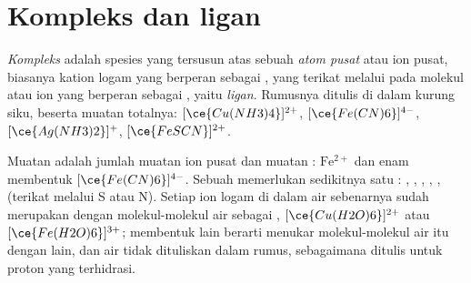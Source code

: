 \section{Kompleks dan ligan}

\begin{definition}\label{def:b1:complexation:complex}
\emph{Kompleks} adalah spesies yang tersusun atas sebuah
\emph{atom pusat} atau ion pusat, biasanya kation logam
yang berperan sebagai , yang terikat melalui  pada
molekul atau ion yang berperan sebagai , yaitu
\emph{ligan}. Rumusnya ditulis di dalam kurung siku, beserta
muatan totalnya: $[\ce{Cu(NH3)4}]^{2+}$,
$[\ce{Fe(CN)6}]^{4-}$, $[\ce{Ag(NH3)2}]^{+}$, $[\ce{FeSCN}]^{2+}$.
\end{definition}

Muatan  adalah jumlah muatan ion pusat dan muatan :
$\mathrm{Fe^{2+}}$ dan enam  membentuk
$[\ce{Fe(CN)6}]^{4-}$. Sebuah  memerlukan sedikitnya satu : , , , , ,
 (terikat melalui S atau N). Setiap ion logam di dalam air
sebenarnya sudah merupakan  dengan molekul-molekul air sebagai
, $[\ce{Cu(H2O)6}]^{2+}$ atau $[\ce{Fe(H2O)6}]^{3+}$; membentuk
 lain berarti menukar molekul-molekul air itu dengan  lain,
dan  air tidak dituliskan dalam rumus, sebagaimana  ditulis
untuk proton yang terhidrasi.

